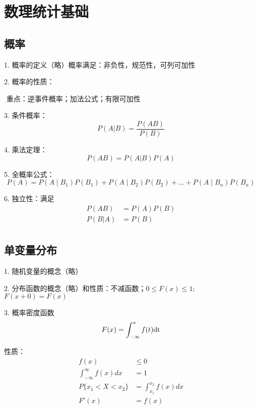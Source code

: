 \chapter{数理统计基础}
\section{概率}

1. 概率的定义（略）概率满足：非负性，规范性，可列可加性

2. 概率的性质：

   ​	重点：逆事件概率；加法公式；有限可加性

3. 条件概率：
\begin{equation}
    P(A|B)=\frac{P(AB)}{P(B)}
\end{equation}

4. 乘法定理：
\begin{equation}
    P(AB)=P(A|B)P(A)
\end{equation}

5. 全概率公式：
\begin{equation}
    P(A)=P\left(A \mid B_{1}\right) P\left(B_{1}\right)+
    P\left(A \mid B_{2}\right) P\left(B_{2}\right)+\ldots+
    P\left(A \mid B_{n}\right) P\left(B_{n}\right)
\end{equation}

6. 独立性：满足
\begin{subequations}
    \begin{align}
        P(AB)&=P(A)P(B) \\ 
        P(B|A)&=P(B)\\
    \end{align}
\end{subequations}

 \section{单变量分布}
 1. 随机变量的概念（略）

 2. 分布函数的概念（略）和性质：不减函数；$0\leq F(x)\leq 1 $; $F(x+0)=F(x)$
 
 3. 概率密度函数
 \begin{equation}
    F(x)=\int_{-\infty}^{x}f(t) \rm dt
\end{equation}
 
 性质：
\begin{subequations}
\begin{align}
    f(x)&\leq 0 \\ 
    \int_{-\infty}^{\infty}f(x)dx&=1\\
    P\{x_1<X<x_2\}&=\int_{x_1}^{x_2}f(x)dx\\
    F'(x)&=f(x)
\end{align}
\end{subequations}


